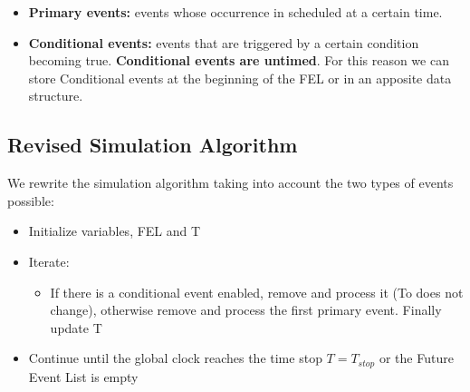 \begin{itemize}
    \item \textbf{Primary events:} events whose occurrence in scheduled at a certain time.
    \item \textbf{Conditional events:} events that are triggered by a certain condition becoming true. \textbf{Conditional events are untimed}. For this reason we can store Conditional events at the beginning of the FEL or in an apposite data structure.
\end{itemize}

\subsection{Revised Simulation Algorithm}
We rewrite the simulation algorithm taking into account the two types of events possible:
\begin{itemize}
    \item Initialize variables, FEL and T
    \item Iterate:
        \begin{itemize}
            \item If there is a conditional event enabled, remove and process it (To does not change), otherwise remove and process the first primary event. Finally update T
        \end{itemize}
    \item Continue until the global clock reaches the time stop $T = T_{stop}$ or the Future Event List is empty 
\end{itemize}
